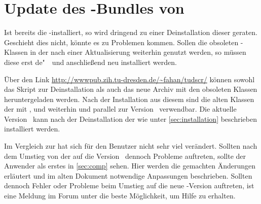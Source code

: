 \documentclass[%
  english,ngerman,%
  headings=optiontoheadandtoc,captions=tableheading,numbers=noenddot,%
  chapterpage,cdfoot,%
]{tudscrman}
\begin{document}
\section{Update des \TUDScript-Bundles von \vTUD}
%
%
%
%
Ist bereits die \TUDScript-\vTUD installiert, so wird dringend zu einer 
Deinstallation dieser geraten. Geschieht dies nicht, könnte es zu Problemen 
kommen. Sollen die obsoleten \TUDScript-Klassen in der \vTUD nach einer 
Aktualisierung weiterhin genutzt werden, so müssen diese erst de"~~und 
anschließend neu installiert werden.

Über den Link \url{http://wwwpub.zih.tu-dresden.de/~fahan/tudscr/} können sowohl 
das Skript zur Deinstallation  als auch das 
neue Archiv mit den obsoleten Klassen 
heruntergeladen werden. Nach der Installation aus diesem sind die alten Klassen 
der \vTUD mit ,  und 
 weiterhin und parallel zur Version~\vTUDScript{} 
verwendbar. Die aktuelle Version~\vTUDScript{} kann nach der Deinstallation der 
\vTUD wie unter \autoref{sec:installation} beschrieben installiert werden.

Im Vergleich zur \vTUD hat sich für den Benutzer nicht sehr viel verändert. 
Sollten nach dem Umstieg von der \vTUD auf die Version~\vTUDScript{} dennoch 
Probleme auftreten, sollte der Anwender als erstes in \autoref{sec:comp} sehen. 
Hier werden die gemachten Änderungen erläutert und im alten Dokument notwendige 
Anpassungen beschrieben. Sollten dennoch Fehler oder Probleme beim Umstieg auf 
die neue \TUDScript-Version auftreten, ist eine Meldung im Forum unter \forum 
die beste Möglichkeit, um Hilfe zu erhalten.
\end{document}
